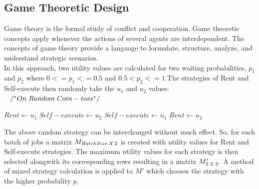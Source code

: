 \subsection{Game Theoretic Design}
Game theory is the formal study of conflict and cooperation. Game theoretic concepts apply whenever the actions of several agents are interdependent. The concepts of game theory provide a language to formulate, structure, analyze, and understand strategic scenarios.\\[0.2cm]
In this approach, two utility values are calculated for two waiting probabilities, $p_1$ and $p_2$ where $0<=p_1<=0.5$ and $0.5<p_2<=1$.The strategies of Rent and Self-execute then randomly take the $u_1$ and $u_2$ values:\\[0.3cm]
$\hspace*{3mm}/^\ast On\hspace*{1mm}Random\hspace*{1mm}Coin-toss^\ast/$\\
\begin{algorithmic}
	\STATE $Rent \gets u_1$
	\STATE $Self-execute \gets u_2$
\ELSE
	\STATE $Self-execute \gets u_1$
	\STATE $Rent \gets u_2$
\ENDIF
\end{algorithmic}
\vspace{0.2cm}
The above random strategy can be interchanged without much effect. So, for each batch of jobs a matrix $M_{Batch Size\hspace*{0.5mm}X\hspace*{0.5mm}2}$ is created with utility values for Rent and Self-execute strategies. The maximum utility values for each strategy is then selected alongwith its corresponding rows resulting in a matrix $M'_{2\hspace*{0.5mm}X\hspace*{0.5mm} 2}$. A method of mixed strategy calculation is applied to $M'$ which chooses the strategy with the higher probability $p$.\\[0.2cm]

